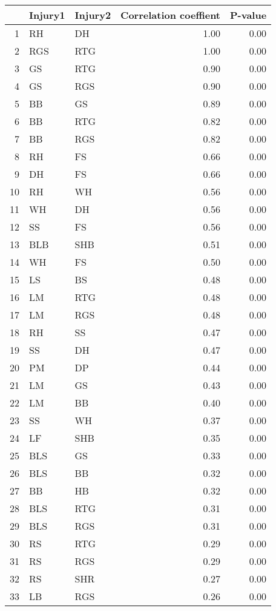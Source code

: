 \begin{table}[ht]
\centering
\begin{tabular}{rllrr}
  \hline
 & Injury1 & Injury2 & Correlation coeffient & P-value \\ 
  \hline
1 & RH & DH & 1.00 & 0.00 \\ 
  2 & RGS & RTG & 1.00 & 0.00 \\ 
  3 & GS & RTG & 0.90 & 0.00 \\ 
  4 & GS & RGS & 0.90 & 0.00 \\ 
  5 & BB & GS & 0.89 & 0.00 \\ 
  6 & BB & RTG & 0.82 & 0.00 \\ 
  7 & BB & RGS & 0.82 & 0.00 \\ 
  8 & RH & FS & 0.66 & 0.00 \\ 
  9 & DH & FS & 0.66 & 0.00 \\ 
  10 & RH & WH & 0.56 & 0.00 \\ 
  11 & WH & DH & 0.56 & 0.00 \\ 
  12 & SS & FS & 0.56 & 0.00 \\ 
  13 & BLB & SHB & 0.51 & 0.00 \\ 
  14 & WH & FS & 0.50 & 0.00 \\ 
  15 & LS & BS & 0.48 & 0.00 \\ 
  16 & LM & RTG & 0.48 & 0.00 \\ 
  17 & LM & RGS & 0.48 & 0.00 \\ 
  18 & RH & SS & 0.47 & 0.00 \\ 
  19 & SS & DH & 0.47 & 0.00 \\ 
  20 & PM & DP & 0.44 & 0.00 \\ 
  21 & LM & GS & 0.43 & 0.00 \\ 
  22 & LM & BB & 0.40 & 0.00 \\ 
  23 & SS & WH & 0.37 & 0.00 \\ 
  24 & LF & SHB & 0.35 & 0.00 \\ 
  25 & BLS & GS & 0.33 & 0.00 \\ 
  26 & BLS & BB & 0.32 & 0.00 \\ 
  27 & BB & HB & 0.32 & 0.00 \\ 
  28 & BLS & RTG & 0.31 & 0.00 \\ 
  29 & BLS & RGS & 0.31 & 0.00 \\ 
  30 & RS & RTG & 0.29 & 0.00 \\ 
  31 & RS & RGS & 0.29 & 0.00 \\ 
  32 & RS & SHR & 0.27 & 0.00 \\ 
  33 & LB & RGS & 0.26 & 0.00 \\ 

\end{tabular}
\end{table}
